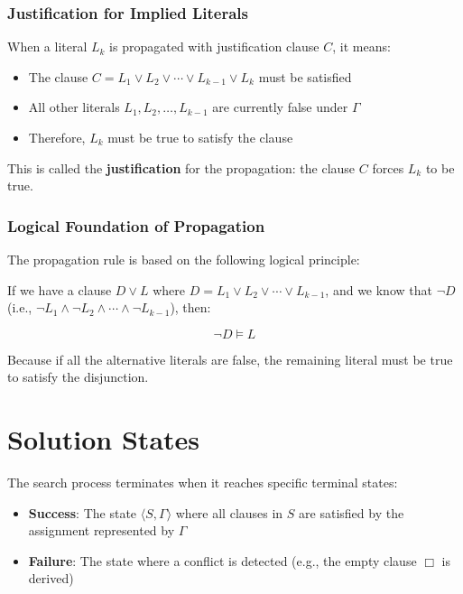 \documentclass[11pt,a4paper]{article}
\theoremstyle{definition}
\theoremstyle{plain}
\theoremstyle{remark}
\begin{document}
\subsubsection{Justification for Implied Literals}

When a literal $L_k$ is propagated with justification clause $C$, it means:

\begin{itemize}
    \item The clause $C = L_1 \lor L_2 \lor \cdots \lor L_{k-1} \lor L_k$ must be satisfied
    \item All other literals $L_1, L_2, \dots, L_{k-1}$ are currently false under $\varGamma$
    \item Therefore, $L_k$ must be true to satisfy the clause
\end{itemize}

This is called the \textbf{justification} for the propagation: the clause $C$ forces $L_k$ to be true.

\subsubsection{Logical Foundation of Propagation}

The propagation rule is based on the following logical principle:

If we have a clause $D \lor L$ where $D = L_1 \lor L_2 \lor \cdots \lor L_{k-1}$, and we know that $\neg D$ (i.e., $\neg L_1 \land \neg L_2 \land \cdots \land \neg L_{k-1}$), then:

\[
\neg D \models L
\]

Because if all the alternative literals are false, the remaining literal must be true to satisfy the disjunction.

\section{Solution States}

The search process terminates when it reaches specific terminal states:

\begin{tcolorbox}[colback=cyan!5!white,colframe=cyan!75!black,title=\textbf{Solution States}]
\begin{itemize}
    \item \textbf{Success}: The state $\langle S, \varGamma \rangle$ where all clauses in $S$ are satisfied by the assignment represented by $\varGamma$
    \item \textbf{Failure}: The state where a conflict is detected (e.g., the empty clause $\Box$ is derived)
\end{itemize}
\end{tcolorbox}
\end{document}
